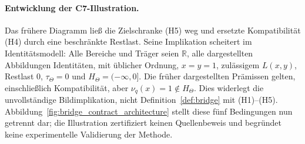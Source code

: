 \documentclass[11pt,a4paper]{article}
\begin{document}
\paragraph{Entwicklung der C7-Illustration.}
Das frühere Diagramm ließ die Zielschranke (H5) weg und ersetzte
Kompatibilität (H4) durch eine beschränkte Restlast. Seine Implikation
scheitert im Identitätsmodell: Alle Bereiche und Träger seien $\mathbb R$,
alle dargestellten Abbildungen Identitäten, mit üblicher Ordnung,
$x=y=1$, zulässigem $L(x,y)$, Restlast $0$, $\tau_\Theta=0$ und
$H_\Theta=(-\infty,0]$. Die früher dargestellten Prämissen gelten,
einschließlich Kompatibilität, aber $\nu_q(x)=1\notin H_\Theta$.
Dies widerlegt die unvollständige Bildimplikation, nicht
Definition~\ref{def:bridge} mit (H1)--(H5).
Abbildung~\ref{fig:bridge_contract_architecture} stellt diese fünf
Bedingungen nun getrennt dar; die Illustration zertifiziert keinen
Quellenbeweis und begründet keine experimentelle Validierung der Methode.
\end{document}
